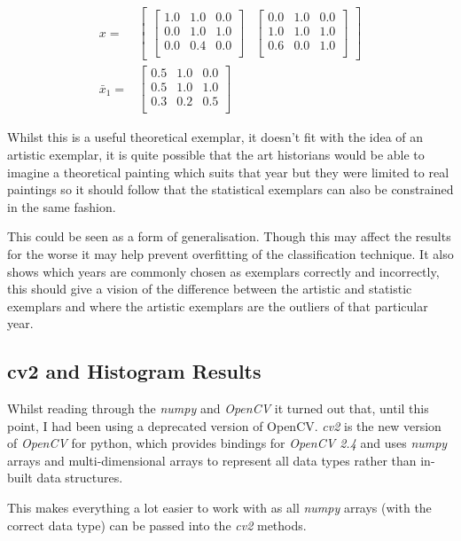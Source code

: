 \begin{align}
x=&\begin{bmatrix}
\begin{bmatrix}
1.0 & 1.0 & 0.0 \\
0.0 & 1.0 & 1.0 \\
0.0 & 0.4 & 0.0 \\
\end{bmatrix} & 
\begin{bmatrix}
0.0 & 1.0 & 0.0 \\
1.0 & 1.0 & 1.0 \\
0.6 & 0.0 & 1.0 \\
\end{bmatrix}
\end{bmatrix} \nonumber \\
\bar{x}_1 =& 
\begin{bmatrix}
0.5 & 1.0 & 0.0 \\
0.5 & 1.0 & 1.0 \\
0.3 & 0.2 & 0.5 \\
\end{bmatrix}
\label{eq:mean-matricies}
\end{align}

Whilst this is a useful theoretical exemplar, it doesn't fit with the idea of an artistic 
exemplar, it is quite possible that the art historians would be able to imagine a theoretical
painting which suits that year but they were limited to real paintings so it should follow that
the statistical exemplars can also be constrained in the same fashion.

This could be seen as a form of generalisation. Though this may affect the results for the worse
it may help prevent overfitting of the classification technique. It also shows which years are 
commonly chosen as exemplars correctly and incorrectly, this should give a vision of the 
difference between the artistic and statistic exemplars and where the artistic exemplars are the
outliers of that particular year.



\subsection{cv2 and Histogram Results}
Whilst reading through the 
\emph{numpy}\cite{EricJonesandTravisOliphantandPearuPetersonandothers2001SciPy} and \emph{OpenCV} 
it turned out that, until this point, I had been using a deprecated version of OpenCV. \emph{cv2} 
is the new version of \emph{OpenCV} for python, which provides bindings for \emph{OpenCV 2.4} and 
uses \emph{numpy} arrays and multi-dimensional arrays to represent all data types rather than 
in-built data structures.

This makes everything a lot easier to work with as all \emph{numpy} arrays (with the correct data type)
can be passed into the \emph{cv2} methods.

